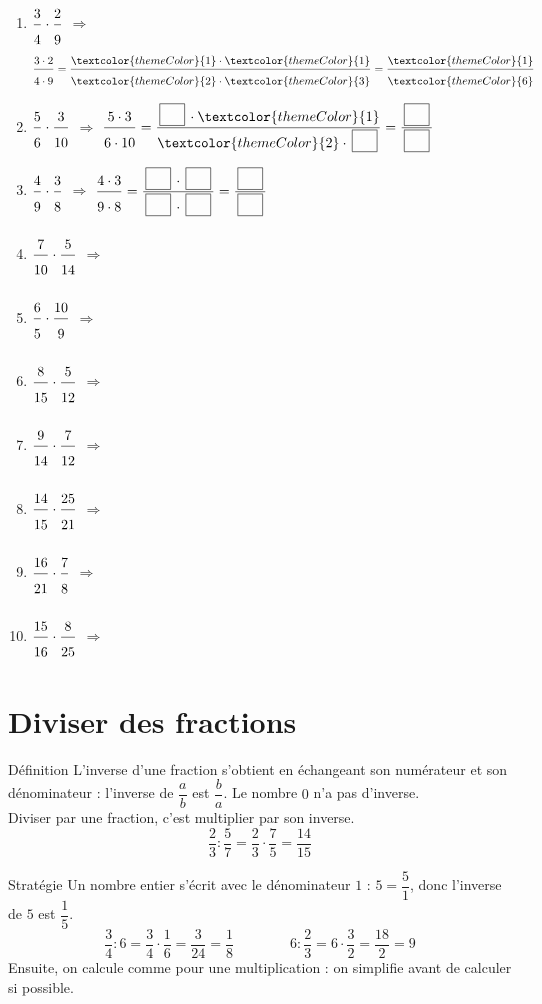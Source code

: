 \begin{enumerate}[leftmargin=*,align=parleft, label=\alph*), itemsep=9pt]
\item $\FA{3}{4}\cdot\FA{2}{9}$ \quad $\Longrightarrow$ \quad $\FA{3 \cdot 2}{4 \cdot 9}=\FA{\textcolor{themeColor}{1} \cdot \textcolor{themeColor}{1}}{\textcolor{themeColor}{2} \cdot \textcolor{themeColor}{3}}=\FA{\textcolor{themeColor}{1}}{\textcolor{themeColor}{6}}$
\item $\FA{5}{6}\cdot\FA{3}{10}$ \quad $\Longrightarrow$ \quad $\FA{5 \cdot 3}{6 \cdot 10}=\FA{\CaseC \cdot \textcolor{themeColor}{1}}{\textcolor{themeColor}{2} \cdot \CaseC}=\FA{\CaseC}{\CaseC}$
\item $\FA{4}{9}\cdot\FA{3}{8}$ \quad $\Longrightarrow$ \quad $\FA{4 \cdot 3}{9 \cdot 8}=\FA{\CaseC \cdot \CaseC}{\CaseC \cdot \CaseC}=\FA{\CaseC}{\CaseC}$
\item $\FA{7}{10}\cdot\FA{5}{14}$ \quad $\Longrightarrow$
\item $\FA{6}{5}\cdot\FA{10}{9}$ \quad $\Longrightarrow$
\item $\FA{8}{15}\cdot\FA{5}{12}$ \quad $\Longrightarrow$
\item $\FA{9}{14}\cdot\FA{7}{12}$ \quad $\Longrightarrow$
\item $\FA{14}{15}\cdot\FA{25}{21}$ \quad $\Longrightarrow$
\item $\FA{16}{21}\cdot\FA{7}{8}$ \quad $\Longrightarrow$
\item $\FA{15}{16}\cdot\FA{8}{25}$ \quad $\Longrightarrow$
\end{enumerate}

\newpage
\section{Diviser des fractions}\label{sec:DiviserFractions}

\begin{regle}{Définition}
L'\textcolor{themeColor}{inverse} d'une fraction s'obtient en échangeant son numérateur et son dénominateur : l'inverse de $\dfrac{a}{b}$ est $\dfrac{b}{a}$. Le nombre $0$ n'a pas d'inverse.\\[5pt]
\textcolor{themeColor}{Diviser} par une fraction, c'est multiplier par son inverse.
\[\dfrac{2}{3} : \dfrac{5}{7}=\dfrac{2}{3} \cdot \dfrac{7}{5}=\dfrac{14}{15}\]
\end{regle}

\vspace{20pt}
\begin{astuce}{Stratégie}
Un nombre entier s'écrit avec le dénominateur $1$ : $5=\dfrac{5}{1}$, donc l'inverse de $5$ est $\dfrac{1}{5}$.
\[\dfrac{3}{4} : 6=\dfrac{3}{4} \cdot \dfrac{1}{6}=\dfrac{3}{24}=\dfrac{1}{8} \qquad\qquad 6 : \dfrac{2}{3}=6 \cdot \dfrac{3}{2}=\dfrac{18}{2}=9\]
Ensuite, on calcule comme pour une multiplication : on simplifie avant de calculer si possible.
\end{astuce}

